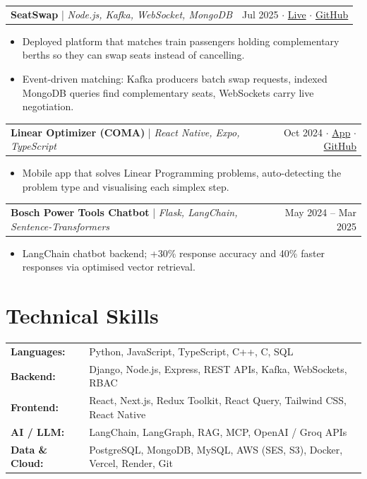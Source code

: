 \documentclass[letterpaper,10pt]{article}
\makeatletter
\newcommand{\project}[3]{%
  \begin{tabularx}{\linewidth}{@{}X r@{}}
    \textbf{#1} {\small\color{muted}| \textit{#2}} & \small #3 \\
  \end{tabularx}\vspace{-3pt}}
\newenvironment{points}{\begin{itemize}[leftmargin=12pt,itemsep=0.5pt,topsep=2pt,parsep=0pt,label={\small\textbullet}]\small}{\end{itemize}\vspace{2pt}}
\makeatother
\begin{document}
\project{SeatSwap}{Node.js, Kafka, WebSocket, MongoDB}{{\color{muted}Jul 2025} $\cdot$ \href{https://seatswap.krishnafauj.in}{Live} $\cdot$ \href{https://github.com/krishnafauj/trainticketswap}{GitHub}}
\begin{points}
  \item Deployed platform that matches train passengers holding complementary berths so they can swap seats instead of cancelling.
  \item Event-driven matching: Kafka producers batch swap requests, indexed MongoDB queries find complementary seats, WebSockets carry live negotiation.
\end{points}

\project{Linear Optimizer (COMA)}{React Native, Expo, TypeScript}{{\color{muted}Oct 2024} $\cdot$ \href{https://drive.google.com/file/d/1eD4n0h7U7JK-hQd-oGtwjvY_i8ieaOlX/view}{App} $\cdot$ \href{https://github.com/krishnafauj/coma_project}{GitHub}}
\begin{points}
  \item Mobile app that solves Linear Programming problems, auto-detecting the problem type and visualising each simplex step.
\end{points}

\project{Bosch Power Tools Chatbot}{Flask, LangChain, Sentence-Transformers}{May 2024 -- Mar 2025}
\begin{points}
  \item LangChain chatbot backend; +30\% response accuracy and 40\% faster responses via optimised vector retrieval.
\end{points}

\section{Technical Skills}
\small
\begin{tabularx}{\linewidth}{@{}l X@{}}
  \textbf{Languages:}\enspace & Python, JavaScript, TypeScript, C++, C, SQL \\
  \textbf{Backend:}\enspace & Django, Node.js, Express, REST APIs, Kafka, WebSockets, RBAC \\
  \textbf{Frontend:}\enspace & React, Next.js, Redux Toolkit, React Query, Tailwind CSS, React Native \\
  \textbf{AI / LLM:}\enspace & LangChain, LangGraph, RAG, MCP, OpenAI / Groq APIs \\
  \textbf{Data \& Cloud:}\enspace & PostgreSQL, MongoDB, MySQL, AWS (SES, S3), Docker, Vercel, Render, Git \\
\end{tabularx}
\end{document}
